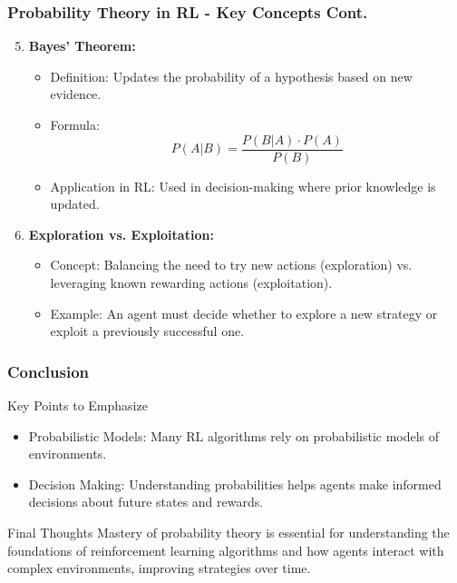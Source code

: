 \documentclass[aspectratio=169]{beamer}
\begin{document}
\begin{frame}[fragile]
    \frametitle{Probability Theory in RL - Key Concepts Cont.}
    \begin{enumerate}
        \setcounter{enumi}{4} %
        \item \textbf{Bayes' Theorem:}
            \begin{itemize}
                \item Definition: Updates the probability of a hypothesis based on new evidence.
                \item Formula:
                    \[
                    P(A|B) = \frac{P(B|A) \cdot P(A)}{P(B)}
                    \]
                \item Application in RL: Used in decision-making where prior knowledge is updated.
            \end{itemize}
        \item \textbf{Exploration vs. Exploitation:}
            \begin{itemize}
                \item Concept: Balancing the need to try new actions (exploration) vs. leveraging known rewarding actions (exploitation).
                \item Example: An agent must decide whether to explore a new strategy or exploit a previously successful one.
            \end{itemize}
    \end{enumerate}
\end{frame}

\begin{frame}[fragile]
    \frametitle{Conclusion}
    \begin{block}{Key Points to Emphasize}
        \begin{itemize}
            \item Probabilistic Models: Many RL algorithms rely on probabilistic models of environments.
            \item Decision Making: Understanding probabilities helps agents make informed decisions about future states and rewards.
        \end{itemize}
    \end{block}
    \begin{block}{Final Thoughts}
        Mastery of probability theory is essential for understanding the foundations of reinforcement learning algorithms 
        and how agents interact with complex environments, improving strategies over time.
    \end{block}
\end{frame}
\end{document}
